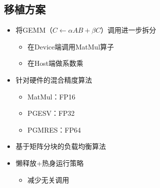 \documentclass[
    fontset=fandol,
    xcolor=svgnames %
]{ctexbeamer}
\begin{document}
\subsection{移植方案}
\begin{frame}
    \begin{itemize}
        \item 将GEMM（$C\leftarrow \alpha AB+\beta C$）调用进一步拆分
              \begin{itemize}
                  \item 在Device端调用MatMul算子
                  \item 在Host端做系数乘
              \end{itemize}
        \item 针对硬件的混合精度算法
              \begin{itemize}
                  \item MatMul：FP16
                  \item PGESV：FP32
                  \item PGMRES：FP64
              \end{itemize}
        \item 基于矩阵分块的负载均衡算法
        \item 懒释放+热身运行策略
              \begin{itemize}
                  \item 减少无关调用
              \end{itemize}
    \end{itemize}
\end{frame}
\end{document}
